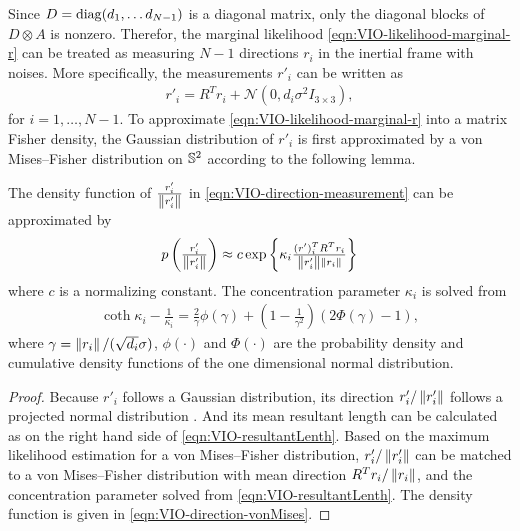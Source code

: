 Since $D = \mathrm{diag}(d_1,\ldots d_{N-1})$ is a diagonal matrix, only the diagonal blocks of $D\otimes A$ is nonzero.
Therefor, the marginal likelihood \eqref{eqn:VIO-likelihood-marginal-r} can be treated as measuring $N-1$ directions $r_i$ in the inertial frame with noises.
More specifically, the measurements $r'_i$ can be written as
\begin{align} \label{eqn:VIO-direction-measurement}
	r'_i = R^Tr_i + \mathcal{N}(0, d_i\sigma^2 I_{3\times 3}),
\end{align}
for $i = 1,\ldots,N-1$.
To approximate \eqref{eqn:VIO-likelihood-marginal-r} into a matrix Fisher density, the Gaussian distribution of $r'_i$ is first approximated by a von Mises--Fisher distribution on $\mathbb{S}^2$ according to the following lemma.

\begin{lemma} \label{thm:VIO-GaussToVM}
	The density function of $\tfrac{r'_i}{\left\| r'_i \right\|}$ in \eqref{eqn:VIO-direction-measurement} can be approximated by
	\begin{align} \label{eqn:VIO-direction-vonMises}
		p\left( \tfrac{r'_i}{\left\| r'_i \right\|} \right) \approx c \exp\left\{ \kappa_i \tfrac{(r')_i^TR^Tr_i}{\left\| r'_i \right\|\left\| r_i \right\|} \right\}
	\end{align}
	where $c$ is a normalizing constant. The concentration parameter $\kappa_i$ is solved from
	\begin{align} \label{eqn:VIO-resultantLenth}
		\coth\kappa_i - \frac{1}{\kappa_i} = \frac{2}{\gamma} \phi(\gamma) + \left( 1-\frac{1}{\gamma^2} \right) (2\Phi(\gamma)-1),
	\end{align}
	where $\gamma = \left\| r_i \right\|/(\sqrt{d_i}\sigma)$, $\phi(\cdot)$ and $\Phi(\cdot)$ are the probability density and cumulative density functions of the one dimensional normal distribution.
\end{lemma}
\begin{proof}
	Because $r'_i$ follows a Gaussian distribution, its direction $r'_i/\left\| r'_i \right\|$ follows a projected normal distribution \cite{mardia2009directional}.
	And its mean resultant length \cite{presnell2008mean} can be calculated as on the right hand side of \eqref{eqn:VIO-resultantLenth}.
	Based on the maximum likelihood estimation \cite{mardia2009directional} for a von Mises--Fisher distribution, $r'_i/\left\| r'_i \right\|$ can be matched to a von Mises--Fisher distribution with mean direction $R^Tr_i/\left\| r_i \right\|$, and the concentration parameter solved from \eqref{eqn:VIO-resultantLenth}.
	The density function is given in \eqref{eqn:VIO-direction-vonMises}.
\end{proof}

